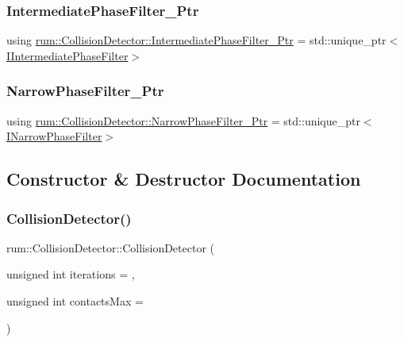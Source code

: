 \subsubsection{\texorpdfstring{Intermediate\+Phase\+Filter\+\_\+\+Ptr}{IntermediatePhaseFilter\_Ptr}}
{\footnotesize\ttfamily using \mbox{\hyperlink{classrum_1_1_collision_detector_aa1a7155543cdbe0265865b3e6f14b260}{rum\+::\+Collision\+Detector\+::\+Intermediate\+Phase\+Filter\+\_\+\+Ptr}} =  std\+::unique\+\_\+ptr$<$\mbox{\hyperlink{classrum_1_1_i_intermediate_phase_filter}{I\+Intermediate\+Phase\+Filter}}$>$}

\mbox{\label{classrum_1_1_collision_detector_a8a6d24fed38f8be11b25e43eaabc9638}} 
\subsubsection{\texorpdfstring{Narrow\+Phase\+Filter\+\_\+\+Ptr}{NarrowPhaseFilter\_Ptr}}
{\footnotesize\ttfamily using \mbox{\hyperlink{classrum_1_1_collision_detector_a8a6d24fed38f8be11b25e43eaabc9638}{rum\+::\+Collision\+Detector\+::\+Narrow\+Phase\+Filter\+\_\+\+Ptr}} =  std\+::unique\+\_\+ptr$<$\mbox{\hyperlink{classrum_1_1_i_narrow_phase_filter}{I\+Narrow\+Phase\+Filter}}$>$}



\subsection{Constructor \& Destructor Documentation}
\mbox{\label{classrum_1_1_collision_detector_a5547ad2cf2a42536f8d653405bbb6485}} 
\subsubsection{\texorpdfstring{Collision\+Detector()}{CollisionDetector()}\hspace{0.1cm}{\footnotesize\ttfamily [1/2]}}
{\footnotesize\ttfamily rum\+::\+Collision\+Detector\+::\+Collision\+Detector (\begin{DoxyParamCaption}\item[{unsigned int}]{iterations = {},  }\item[{unsigned int}]{contacts\+Max = {} }\end{DoxyParamCaption})\hspace{0.3cm}{\ttfamily [explicit]}}

